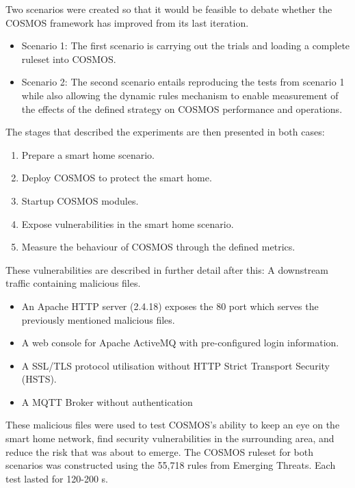 \documentclass[12pt]{report}
\begin{document}
\noindent
Two scenarios were created so that it would be feasible to debate whether the COSMOS framework has improved from its last iteration.
\begin{itemize}
\setlength{\itemsep}{-5pt}
\item Scenario 1: The first scenario is carrying out the trials and loading a complete ruleset into COSMOS.
\item Scenario 2: The second scenario entails reproducing the tests from scenario 1 while also allowing the dynamic rules mechanism to enable measurement of the effects of the defined strategy on COSMOS performance and operations.
 \end{itemize}
The stages that described the experiments are then presented in both cases:
\begin{enumerate}[1.]
\setlength{\itemsep}{-5pt}
\item Prepare a smart home scenario.
\item Deploy COSMOS to protect the smart home.
\item Startup COSMOS modules.
\item Expose vulnerabilities in the smart home scenario.
\item Measure the behaviour of COSMOS through the defined metrics.
\end{enumerate}
These vulnerabilities are described in further detail after this:
A downstream traffic containing malicious files.
\begin{itemize}
\setlength{\itemsep}{-5pt}
\item An Apache HTTP server (2.4.18) exposes the 80 port which serves the previously mentioned malicious files.
\item A web console for Apache ActiveMQ with pre-configured login information.
\item A SSL/TLS protocol utilisation without HTTP Strict Transport Security (HSTS).
\item A MQTT Broker without authentication
 \end{itemize}
These malicious files were used to test COSMOS's ability to keep an eye on the smart home network, find security vulnerabilities in the surrounding area, and reduce the risk that was about to emerge. The COSMOS ruleset for both scenarios was constructed using the 55,718 rules from Emerging Threats. Each test lasted for 120-200 s.

\end{document}
